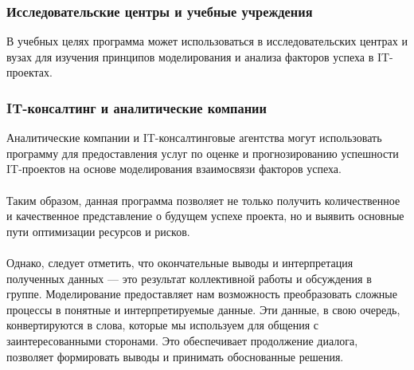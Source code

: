 \documentclass{article}
\begin{document}
    \subsubsection{Исследовательские центры и учебные учреждения}
    В учебных целях программа может использоваться в исследовательских центрах и вузах для изучения принципов моделирования и анализа факторов успеха в IT-проектах.

    \subsubsection{IT-консалтинг и аналитические компании}
    Аналитические компании и IT-консалтинговые агентства могут использовать программу для предоставления услуг по оценке и прогнозированию успешности IT-проектов на основе моделирования взаимосвязи факторов успеха.\\
    ~\\
    Таким образом, данная программа позволяет не только получить количественное и качественное представление о будущем успехе проекта, но и выявить основные пути оптимизации ресурсов и рисков.\\
    ~\\
    Однако, следует отметить, что окончательные выводы и интерпретация полученных данных — это результат коллективной работы и обсуждения в группе. Моделирование предоставляет нам возможность преобразовать сложные процессы в понятные и интерпретируемые данные. Эти данные, в свою очередь, конвертируются в слова, которые мы используем для общения с заинтересованными сторонами. Это обеспечивает продолжение диалога, позволяет формировать выводы и принимать обоснованные решения.\\
\end{document}
